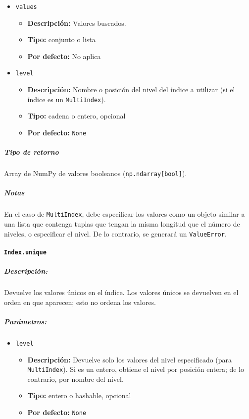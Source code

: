 \begin{itemize}
    \item \texttt{values}
          \begin{itemize}
              \item \textbf{Descripción:} Valores buscados.
              \item \textbf{Tipo:} conjunto o lista
              \item \textbf{Por defecto:} No aplica
          \end{itemize}
    \item \texttt{level}
          \begin{itemize}
              \item \textbf{Descripción:} Nombre o posición del nivel del
                    índice a utilizar (si el índice es un \texttt{MultiIndex}).
              \item \textbf{Tipo:} cadena o entero, opcional
              \item \textbf{Por defecto:} \texttt{None}
          \end{itemize}
\end{itemize}

\subparagraph{Tipo de retorno}
Array de NumPy de valores booleanos (\texttt{np.ndarray[bool]}).

\subparagraph{Notas}
En el caso de \texttt{MultiIndex}, debe especificar los valores como un objeto
similar a una lista que contenga tuplas que tengan la misma longitud que el
número de niveles, o especificar el nivel. De lo contrario, se generará un
\texttt{ValueError}.

\paragraph{\texttt{Index.unique}}

\subparagraph{Descripción:}
Devuelve los valores únicos en el índice. Los valores únicos se devuelven en el
orden en que aparecen; esto no ordena los valores.

\subparagraph{Parámetros:}

\begin{itemize}
    \item \texttt{level}
          \begin{itemize}
              \item \textbf{Descripción:} Devuelve solo los valores del nivel
                    especificado (para \texttt{MultiIndex}). Si es un entero, obtiene el nivel por
                    posición entera; de lo contrario, por nombre del nivel.
              \item \textbf{Tipo:} entero o hashable, opcional
              \item \textbf{Por defecto:} \texttt{None}
          \end{itemize}
\end{itemize}

